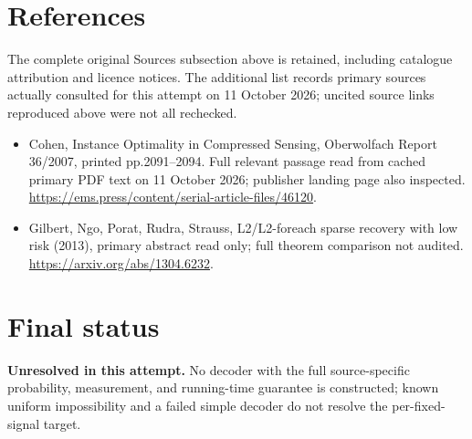\documentclass[11pt]{article}
\begin{document}
\section{References}
The complete original Sources subsection above is retained, including catalogue attribution and licence notices. The additional list records primary sources actually consulted for this attempt on 11 October 2026; uncited source links reproduced above were not all rechecked.
\begin{itemize}
\item Cohen, Instance Optimality in Compressed Sensing, Oberwolfach Report 36/2007, printed pp.2091--2094. Full relevant passage read from cached primary PDF text on 11 October 2026; publisher landing page also inspected. \url{https://ems.press/content/serial-article-files/46120}.
\item Gilbert, Ngo, Porat, Rudra, Strauss, L2/L2-foreach sparse recovery with low risk (2013), primary abstract read only; full theorem comparison not audited. \url{https://arxiv.org/abs/1304.6232}.
\end{itemize}
\section{Final status}
\textbf{Unresolved in this attempt.} No decoder with the full source-specific probability, measurement, and running-time guarantee is constructed; known uniform impossibility and a failed simple decoder do not resolve the per-fixed-signal target.
\end{document}
